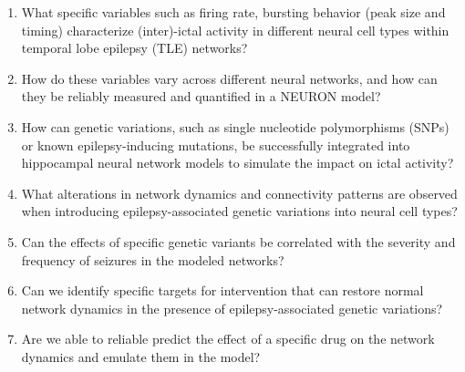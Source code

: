 \begin{enumerate}
    \item What specific variables such as firing rate, bursting behavior (peak size and timing) characterize (inter)-ictal activity in different neural cell types within temporal lobe epilepsy (TLE) networks?
    \item How do these variables vary across different neural networks, and how can they be reliably measured and quantified in a NEURON model?
    \item How can genetic variations, such as single nucleotide polymorphisms (SNPs) or known epilepsy-inducing mutations, be successfully integrated into hippocampal neural network models to simulate the impact on ictal activity?
    \item What alterations in network dynamics and connectivity patterns are observed when introducing epilepsy-associated genetic variations into neural cell types?
    \item Can the effects of specific genetic variants be correlated with the severity and frequency of seizures in the modeled networks?
    \item Can we identify specific targets for intervention that can restore normal network dynamics in the presence of epilepsy-associated genetic variations?
    \item Are we able to reliable predict the effect of a specific drug on the network dynamics and emulate them in the model?
\end{enumerate}